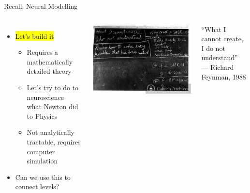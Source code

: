 \documentclass[handout,aspectratio=169]{beamer}
\begin{document}
\begin{frame}{Recall: Neural Modelling}
	\begin{overlayarea}{\textwidth}{7cm}
		\begin{columns}[c]
			\begin{itemize}
				\setlength\itemsep{0.25cm}
				\item \hl{Let's build it}\\[0.125cm]
				\begin{itemize}
					\setlength\itemsep{0.25cm}
					\item Requires a mathematically detailed theory
					\item Let's try to do to neuroscience what Newton did to Physics
					\item Not analytically tractable, requires computer simulation
				\end{itemize}
				\item Can we use this to connect levels?
			\end{itemize}
        \centering
        \includegraphics[width=\columnwidth]{media/feynman_blackboard.jpg}
        \begin{center}
          \color{aluminium4}
          \quotefont \enquote{What I cannot create, I do not understand} \\ --- Richard Feynman, 1988
        \end{center}
  		\end{columns}
	\end{overlayarea}
\end{frame}
\end{document}
